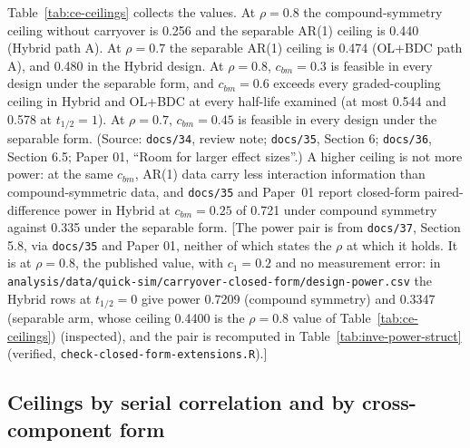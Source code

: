 \documentclass[11pt]{article}
\newcommand{\note}[1]{\textcolor{blue!60!black}{\small [#1]}}
\newcommand{\code}[1]{\texttt{#1}}
\begin{document}
Table~\ref{tab:ce-ceilings} collects the values. At $\rho = 0.8$ the
compound-symmetry ceiling without carryover is 0.256 and the separable
AR(1) ceiling is 0.440 (Hybrid path A). At $\rho = 0.7$ the separable
AR(1) ceiling is 0.474 (OL+BDC path A), and 0.480 in the Hybrid design.
At $\rho = 0.8$, $c_{bm} = 0.3$ is feasible in every design under the
separable form, and $c_{bm} = 0.6$ exceeds every graded-coupling
ceiling in Hybrid and OL+BDC at every half-life examined (at most 0.544
and 0.578 at $t_{1/2} = 1$). At $\rho = 0.7$, $c_{bm} = 0.45$ is
feasible in every design under the separable form. (Source: \code{docs/34}, review
note; \code{docs/35}, Section 6; \code{docs/36}, Section 6.5; Paper 01,
``Room for larger effect sizes''.) A higher ceiling is not more
power: at the same $c_{bm}$, AR(1) data carry less interaction
information than compound-symmetric data, and \code{docs/35} and
Paper~01 report closed-form paired-difference power in Hybrid at
$c_{bm} = 0.25$ of 0.721 under compound symmetry against 0.335 under
the separable form. \note{The power pair is from \code{docs/37},
Section 5.8, via \code{docs/35} and Paper 01, neither of which states
the $\rho$ at which it holds. It is at $\rho = 0.8$, the published
value, with $c_1 = 0.2$ and no measurement error: in
\code{analysis/data/quick-sim/carryover-closed-form/design-power.csv}
the Hybrid rows at $t_{1/2} = 0$ give power 0.7209 (compound symmetry)
and 0.3347 (separable arm, whose ceiling 0.4400 is the $\rho = 0.8$
value of Table~\ref{tab:ce-ceilings}) (inspected), and the pair is
recomputed in Table~\ref{tab:inve-power-struct} (verified,
\code{check-closed-form-extensions.R}).}

\subsection{Ceilings by serial correlation and by cross-component form}
\label{sec:invd-ce-rho}
\end{document}
